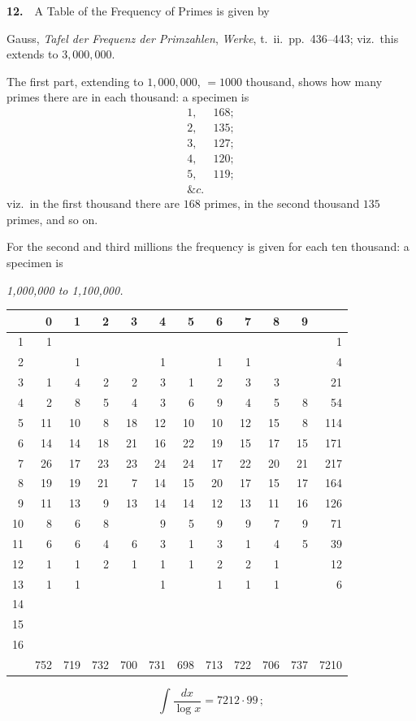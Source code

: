 \documentclass[11pt,a4paper]{article}
\begin{document}
\textbf{12.}\ \ A Table of the Frequency of Primes is given by

Gauss, \textit{Tafel der Frequenz der Primzahlen}, \textit{Werke}, t.~ii.\ pp.~436--443; viz.\ this extends to $3{,}000{,}000$.

The first part, extending to $1{,}000{,}000$, $=1000$ thousand, shows how many primes there are in each thousand: a specimen is
\[
\begin{array}{rl}
1, & 168;\\
2, & 135;\\
3, & 127;\\
4, & 120;\\
5, & 119;\\
\&c. &
\end{array}
\]
viz.\ in the first thousand there are $168$ primes, in the second thousand $135$ primes, and so on.

For the second and third millions the frequency is given for each ten thousand: a specimen is
\begin{center}
\textit{1,000,000 to 1,100,000.}
\end{center}

\begin{center}
\renewcommand{\arraystretch}{1.0}
\begin{tabular}{r|rrrrrrrrrr|r}
\hline
 & 0 & 1 & 2 & 3 & 4 & 5 & 6 & 7 & 8 & 9 &  \\\hline
1  & 1 &    &    &    &    &    &    &    &    &    & 1 \\
2  &   & 1  &    &    & 1  &    & 1  & 1  &    &    & 4 \\
3  & 1 & 4  & 2  & 2  & 3  & 1  & 2  & 3  & 3  &    & 21 \\
4  & 2 & 8  & 5  & 4  & 3  & 6  & 9  & 4  & 5  & 8  & 54 \\
5  & 11& 10 & 8  & 18 & 12 & 10 & 10 & 12 & 15 & 8  & 114 \\
6  & 14& 14 & 18 & 21 & 16 & 22 & 19 & 15 & 17 & 15 & 171 \\
7  & 26& 17 & 23 & 23 & 24 & 24 & 17 & 22 & 20 & 21 & 217 \\
8  & 19& 19 & 21 & 7  & 14 & 15 & 20 & 17 & 15 & 17 & 164 \\
9  & 11& 13 & 9  & 13 & 14 & 14 & 12 & 13 & 11 & 16 & 126 \\
10 & 8 & 6  & 8  &    & 9  & 5  & 9  & 9  & 7  & 9  & 71 \\
11 & 6 & 6  & 4  & 6  & 3  & 1  & 3  & 1  & 4  & 5  & 39 \\
12 & 1 & 1  & 2  & 1  & 1  & 1  & 2  & 2  & 1  &    & 12 \\
13 & 1 & 1  &    &    & 1  &    & 1  & 1  & 1  &    & 6 \\
14 &   &    &    &    &    &    &    &    &    &    &   \\
15 &   &    &    &    &    &    &    &    &    &    &   \\
16 &   &    &    &    &    &    &    &    &    &    &   \\\hline
   & 752 & 719 & 732 & 700 & 731 & 698 & 713 & 722 & 706 & 737 & 7210 \\\hline
\end{tabular}
\end{center}
\[
\int\frac{dx}{\log x} = 7212\cdot 99\,;
\]
\end{document}
